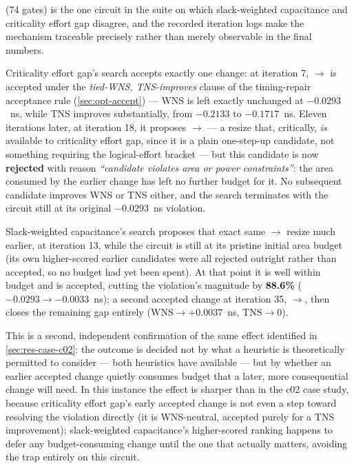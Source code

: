  (74 gates) is the one circuit in
the suite on which slack-weighted capacitance and criticality effort gap
disagree, and the recorded iteration logs make the mechanism traceable
precisely rather than merely observable in the final numbers.

Criticality effort gap's search accepts exactly one change: at iteration 7,
\newline $\rightarrow$ is accepted under the
\emph{tied-WNS, TNS-improves} clause of the timing-repair acceptance rule
(\cref{sec:opt-accept}) --- WNS is left exactly unchanged at
$-0.0293$~ns, while TNS improves substantially, from $-0.2133$ to
$-0.1717$~ns. Eleven iterations later, at iteration 18, it proposes
$\rightarrow$ --- a resize that,
critically, \emph{is} available to criticality effort gap, since it is a
plain one-step-up candidate, not something requiring the logical-effort
bracket --- but this candidate is now \textbf{rejected} with reason
\emph{``candidate violates area or power constraints''}: the area consumed
by the earlier  change has left no further budget for it. No
subsequent candidate improves WNS or TNS either, and the search terminates
 with the circuit still at its original
$-0.0293$~ns violation.

Slack-weighted capacitance's search proposes that exact same
$\rightarrow$ resize much earlier, at
iteration 13, while the circuit is still at its pristine initial area
budget (its own higher-scored earlier candidates were all rejected
outright rather than accepted, so no budget had yet been spent). At that
point it is well within budget and is accepted, cutting the violation's
magnitude by \textbf{88.6\%} ($-0.0293\rightarrow-0.0033$~ns); a second
accepted change at
iteration 35, $\rightarrow$, then
closes the remaining gap entirely ($\mathrm{WNS}\rightarrow+0.0037$~ns,
$\mathrm{TNS}\rightarrow 0$).

This is a second, independent confirmation of the same effect identified
in \cref{sec:res-case-c02}: the outcome is decided not by what a heuristic
is theoretically permitted to consider --- both heuristics have 
available --- but by whether an earlier accepted change quietly consumes
budget that a later, more consequential change will need. In this instance
the effect is sharper than in the c02 case study, because
criticality effort gap's early accepted change is not even a step toward
resolving the violation directly (it is WNS-neutral, accepted purely for a
TNS improvement); slack-weighted capacitance's higher-scored ranking
happens to defer any budget-consuming change until the one that actually
matters, avoiding the trap entirely on this circuit.

